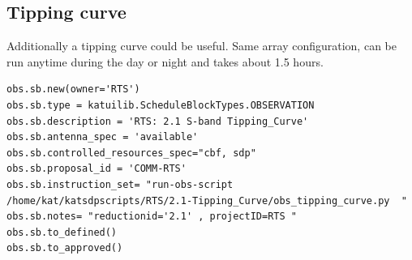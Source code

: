 \subsection{ Tipping curve }
Additionally a tipping curve could be useful.
Same array configuration, can be run anytime during the day or night and takes about 1.5 hours.
\begin{lstlisting}[style=DOS]
obs.sb.new(owner='RTS')
obs.sb.type = katuilib.ScheduleBlockTypes.OBSERVATION
obs.sb.description = 'RTS: 2.1 S-band Tipping_Curve'
obs.sb.antenna_spec = 'available'
obs.sb.controlled_resources_spec="cbf, sdp"
obs.sb.proposal_id = 'COMM-RTS'
obs.sb.instruction_set= "run-obs-script /home/kat/katsdpscripts/RTS/2.1-Tipping_Curve/obs_tipping_curve.py  "
obs.sb.notes= "reductionid='2.1' , projectID=RTS "
obs.sb.to_defined()
obs.sb.to_approved() 

\end{lstlisting}


